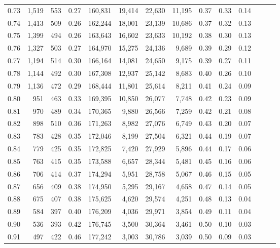 \begin{tabular}{rrrrrrrrrrrrrr}
0.73 &  1,519 &  553 &  0.27 &  160,831 &   19,414 &  22,630 &  11,195 &  0.37 &  0.33 &      0.14 \\
0.74 &  1,413 &  509 &  0.26 &  162,244 &   18,001 &  23,139 &  10,686 &  0.37 &  0.32 &      0.13 \\
0.75 &  1,399 &  494 &  0.26 &  163,643 &   16,602 &  23,633 &  10,192 &  0.38 &  0.30 &      0.13 \\
0.76 &  1,327 &  503 &  0.27 &  164,970 &   15,275 &  24,136 &   9,689 &  0.39 &  0.29 &      0.12 \\
0.77 &  1,194 &  514 &  0.30 &  166,164 &   14,081 &  24,650 &   9,175 &  0.39 &  0.27 &      0.11 \\
0.78 &  1,144 &  492 &  0.30 &  167,308 &   12,937 &  25,142 &   8,683 &  0.40 &  0.26 &      0.10 \\
0.79 &  1,136 &  472 &  0.29 &  168,444 &   11,801 &  25,614 &   8,211 &  0.41 &  0.24 &      0.09 \\
0.80 &    951 &  463 &  0.33 &  169,395 &   10,850 &  26,077 &   7,748 &  0.42 &  0.23 &      0.09 \\
0.81 &    970 &  489 &  0.34 &  170,365 &    9,880 &  26,566 &   7,259 &  0.42 &  0.21 &      0.08 \\
0.82 &    898 &  510 &  0.36 &  171,263 &    8,982 &  27,076 &   6,749 &  0.43 &  0.20 &      0.07 \\
0.83 &    783 &  428 &  0.35 &  172,046 &    8,199 &  27,504 &   6,321 &  0.44 &  0.19 &      0.07 \\
0.84 &    779 &  425 &  0.35 &  172,825 &    7,420 &  27,929 &   5,896 &  0.44 &  0.17 &      0.06 \\
0.85 &    763 &  415 &  0.35 &  173,588 &    6,657 &  28,344 &   5,481 &  0.45 &  0.16 &      0.06 \\
0.86 &    706 &  414 &  0.37 &  174,294 &    5,951 &  28,758 &   5,067 &  0.46 &  0.15 &      0.05 \\
0.87 &    656 &  409 &  0.38 &  174,950 &    5,295 &  29,167 &   4,658 &  0.47 &  0.14 &      0.05 \\
0.88 &    675 &  407 &  0.38 &  175,625 &    4,620 &  29,574 &   4,251 &  0.48 &  0.13 &      0.04 \\
0.89 &    584 &  397 &  0.40 &  176,209 &    4,036 &  29,971 &   3,854 &  0.49 &  0.11 &      0.04 \\
0.90 &    536 &  393 &  0.42 &  176,745 &    3,500 &  30,364 &   3,461 &  0.50 &  0.10 &      0.03 \\
0.91 &    497 &  422 &  0.46 &  177,242 &    3,003 &  30,786 &   3,039 &  0.50 &  0.09 &      0.03 \\

\end{tabular}
